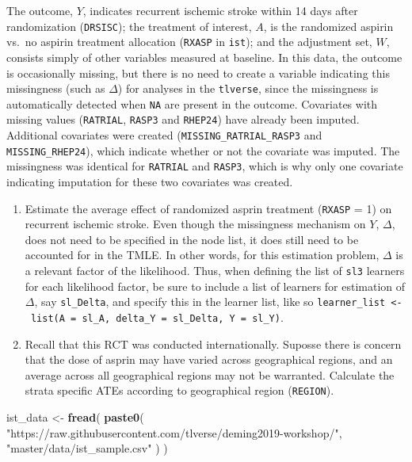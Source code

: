 \documentclass[12pt, krantz2,]{book}
\newenvironment{Shaded}{\begin{snugshade}}{\end{snugshade}}
\newcommand{\KeywordTok}[1]{\textcolor[rgb]{0.13,0.29,0.53}{\textbf{#1}}}
\newcommand{\NormalTok}[1]{#1}
\newcommand{\StringTok}[1]{\textcolor[rgb]{0.31,0.60,0.02}{#1}}
\providecommand{\tightlist}{%
  \setlength{\itemsep}{0pt}\setlength{\parskip}{0pt}}
\theoremstyle{definition}
\theoremstyle{definition}
\theoremstyle{definition}
\newcommand{\1}{\mathbbm{1}}
\begin{document}
The outcome, \(Y\), indicates recurrent ischemic stroke within 14 days after
randomization (\texttt{DRSISC}); the treatment of interest, \(A\), is the randomized
aspirin vs.~no aspirin treatment allocation (\texttt{RXASP} in \texttt{ist}); and the
adjustment set, \(W\), consists simply of other variables measured at baseline. In
this data, the outcome is occasionally missing, but there is no need to create a
variable indicating this missingness (such as \(\Delta\)) for analyses in the
\texttt{tlverse}, since the missingness is automatically detected when \texttt{NA} are present
in the outcome. Covariates with missing values (\texttt{RATRIAL}, \texttt{RASP3} and \texttt{RHEP24})
have already been imputed. Additional covariates were created
(\texttt{MISSING\_RATRIAL\_RASP3} and \texttt{MISSING\_RHEP24}), which indicate whether or not
the covariate was imputed. The missingness was identical for \texttt{RATRIAL} and
\texttt{RASP3}, which is why only one covariate indicating imputation for these two
covariates was created.

\begin{enumerate}
\def\labelenumi{\arabic{enumi}.}
\tightlist
\item
  Estimate the average effect of randomized asprin treatment (\texttt{RXASP} = 1) on
  recurrent ischemic stroke. Even though the missingness mechanism on \(Y\),
  \(\Delta\), does not need to be specified in the node list, it does still need
  to be accounted for in the TMLE. In other words, for this estimation problem,
  \(\Delta\) is a relevant factor of the likelihood. Thus, when defining the
  list of \texttt{sl3} learners for each likelihood factor, be sure to include a list
  of learners for estimation of \(\Delta\), say \texttt{sl\_Delta}, and specify this in
  the learner list, like so
  \texttt{learner\_list\ \textless{}-\ list(A\ =\ sl\_A,\ delta\_Y\ =\ sl\_Delta,\ Y\ =\ sl\_Y)}.
\item
  Recall that this RCT was conducted internationally. Suposse there is concern
  that the dose of asprin may have varied across geographical regions, and an
  average across all geographical regions may not be warranted. Calculate the
  strata specific ATEs according to geographical region (\texttt{REGION}).
\end{enumerate}

\begin{Shaded}
\begin{Highlighting}[]
\NormalTok{ist_data <-}\StringTok{ }\KeywordTok{fread}\NormalTok{(}
  \KeywordTok{paste0}\NormalTok{(}
    \StringTok{"https://raw.githubusercontent.com/tlverse/deming2019-workshop/"}\NormalTok{,}
    \StringTok{"master/data/ist_sample.csv"}
\NormalTok{  )}
\NormalTok{)}
\end{Highlighting}
\end{Shaded}
\end{document}
